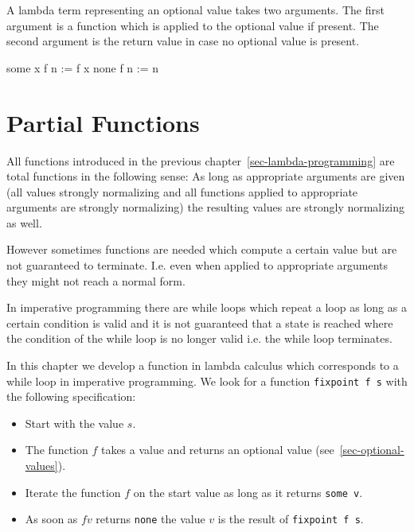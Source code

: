 \documentclass[12pt]{article}
\begin{document}
A lambda term representing an optional value takes two arguments. The first
argument is a function which is applied to the optional value if present. The
second argument is the return value in case no optional value is present.



\begin{lam}
    some x   f n :=  f x
    none     f n :=  n
\end{lam}














\section{Partial Functions}
\label{sec-partial-functions}

All functions introduced in the previous chapter~\ref{sec-lambda-programming}
are total functions in the following sense: As long as appropriate arguments are
given (all values strongly normalizing and all functions applied to appropriate
arguments are strongly normalizing) the resulting values are strongly
normalizing as well.

However sometimes functions are needed which compute a certain value but are not
guaranteed to terminate. I.e. even when applied to appropriate arguments they might
not reach a normal form.

In imperative programming there are while loops which repeat a loop as long as a
certain condition is valid and it is not guaranteed that a state is reached
where the condition of the while loop is no longer valid i.e. the while loop
terminates.

In this chapter we develop a function in lambda calculus which corresponds to a
while loop in imperative programming. We look for a function {\tt fixpoint f s}
with the following specification:
\begin{itemize}
    \item Start with the value $s$.

    \item The function $f$ takes a value and returns an optional value
        (see~\ref{sec-optional-values}).

    \item Iterate the function $f$
        on the start value as long as it returns {\tt some v}.

    \item As soon as $f v$ returns {\tt none} the value $v$ is the
        result of {\tt fixpoint f s}.
\end{itemize}
\end{document}
